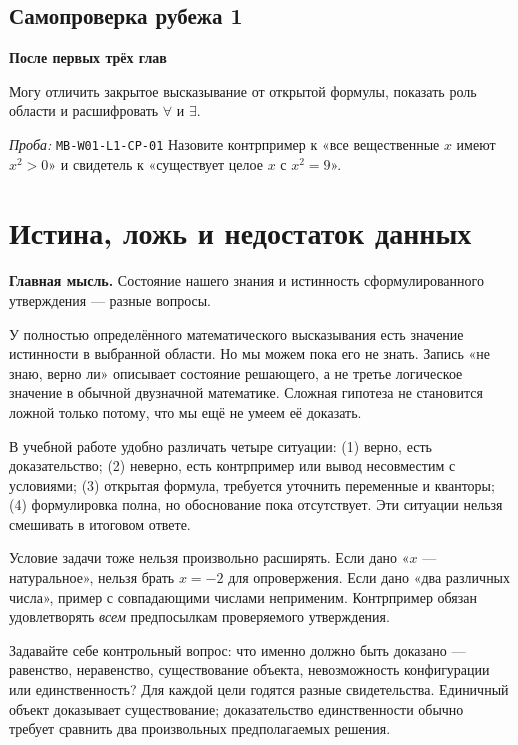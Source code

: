 \documentclass[11pt,a4paper,openany]{book}
\newcommand{\mtag}[1]{\textsf{\small\color{mbaccent}\bfseries #1}}
\newcommand{\muid}[1]{\texttt{\footnotesize #1}}
\begin{document}
\subsection*{Самопроверка рубежа 1}\mtag{После первых трёх глав}\par Могу отличить закрытое высказывание от открытой формулы, показать роль области и расшифровать $\forall$ и $\exists$.\par \textit{Проба:} \muid{MB-W01-L1-CP-01} Назовите контрпример к «все вещественные $x$ имеют $x^2>0$» и свидетель к «существует целое $x$ с $x^2=9$». 

\medskip

\section{Истина, ложь и недостаток данных}\label{theory:4}

\begin{keybox}\textbf{Главная мысль.} Состояние нашего знания и истинность сформулированного утверждения — разные вопросы.\end{keybox}

У полностью определённого математического высказывания есть значение истинности в выбранной области. Но мы можем пока его не знать. Запись «не знаю, верно ли» описывает состояние решающего, а не третье логическое значение в обычной двузначной математике. Сложная гипотеза не становится ложной только потому, что мы ещё не умеем её доказать.


В учебной работе удобно различать четыре ситуации: (1) верно, есть доказательство; (2) неверно, есть контрпример или вывод несовместим с условиями; (3) открытая формула, требуется уточнить переменные и кванторы; (4) формулировка полна, но обоснование пока отсутствует. Эти ситуации нельзя смешивать в итоговом ответе.


Условие задачи тоже нельзя произвольно расширять. Если дано «$x$ — натуральное», нельзя брать $x=-2$ для опровержения. Если дано «два различных числа», пример с совпадающими числами неприменим. Контрпример обязан удовлетворять \emph{всем} предпосылкам проверяемого утверждения.


Задавайте себе контрольный вопрос: что именно должно быть доказано — равенство, неравенство, существование объекта, невозможность конфигурации или единственность? Для каждой цели годятся разные свидетельства. Единичный объект доказывает существование; доказательство единственности обычно требует сравнить два произвольных предполагаемых решения.
\end{document}
